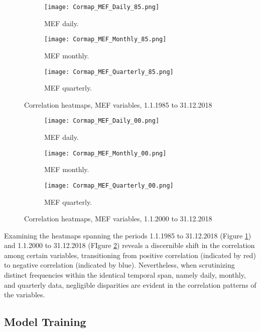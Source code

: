 \documentclass{article}
\begin{document}
\begin{figure}[H]
  \centering
  \begin{subfigure}{0.3\linewidth}
    \texttt{[image: Cormap\_MEF\_Daily\_85.png]}
    \caption{MEF daily.}
  \end{subfigure}
  \hfill
  \begin{subfigure}{0.3\linewidth}
    \texttt{[image: Cormap\_MEF\_Monthly\_85.png]}
    \caption{MEF monthly.}
  \end{subfigure}
  \hfill
  \begin{subfigure}{0.3\linewidth}
    \texttt{[image: Cormap\_MEF\_Quarterly\_85.png]}
    \caption{MEF quarterly.}
  \end{subfigure}
  \caption{Correlation heatmaps, MEF variables, 1.1.1985 to 31.12.2018}
  \label{fig:cormap1}
\end{figure}

\begin{figure}[H]
  \centering
  \begin{subfigure}{0.3\linewidth}
    \texttt{[image: Cormap\_MEF\_Daily\_00.png]}
    \caption{MEF daily.}
  \end{subfigure}
  \hfill
  \begin{subfigure}{0.3\linewidth}
    \texttt{[image: Cormap\_MEF\_Monthly\_00.png]}
    \caption{MEF monthly.}
  \end{subfigure}
  \hfill
  \begin{subfigure}{0.3\linewidth}
    \texttt{[image: Cormap\_MEF\_Quarterly\_00.png]}
    \caption{MEF quarterly.}
  \end{subfigure}
  \caption{Correlation heatmaps, MEF variables, 1.1.2000 to 31.12.2018}
  \label{fig:cormap2}
\end{figure}

Examining the heatmaps spanning the periods 1.1.1985 to 31.12.2018 (Figure \ref{fig:cormap1}) and 1.1.2000 to 31.12.2018 (FIgure \ref{fig:cormap2}) reveals a discernible shift in the correlation among certain variables, transitioning from positive correlation (indicated by red) to negative correlation (indicated by blue). Nevertheless, when scrutinizing distinct frequencies within the identical temporal span, namely daily, monthly, and quarterly data, negligible disparities are evident in the correlation patterns of the variables.

\subsection{Model Training}
\end{document}
